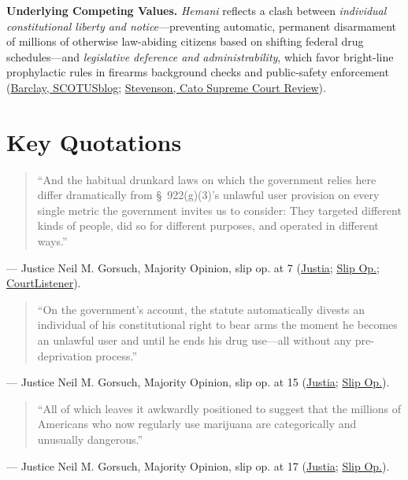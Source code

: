 \documentclass[12pt]{article}
\begin{document}
\textbf{Underlying Competing Values.} \textit{Hemani} reflects a clash between \textit{individual constitutional liberty and notice}---preventing automatic, permanent disarmament of millions of otherwise law-abiding citizens based on shifting federal drug schedules---and \textit{legislative deference and administrability}, which favor bright-line prophylactic rules in firearms background checks and public-safety enforcement (\href{https://www.scotusblog.com/2026/06/hemani-proving-the-reason-not-just-naming-it/}{Barclay, SCOTUSblog}; \href{https://www.cato.org/sites/cato.org/files/2026-09/2025-2026-Supreme-Court-Review-7.pdf}{Stevenson, Cato Supreme Court Review}).

\section{Key Quotations}

\begin{quote}
``And the habitual drunkard laws on which the government relies here differ dramatically from \S~922(g)(3)'s unlawful user provision on every single metric the government invites us to consider: They targeted different kinds of people, did so for different purposes, and operated in different ways.''
\end{quote}
\noindent --- Justice Neil M. Gorsuch, Majority Opinion, slip op. at 7 (\href{https://supreme.justia.com/cases/federal/us/608/24-1234/}{Justia}; \href{https://www.supremecourt.gov/opinions/25pdf/24-1234_g2bh.pdf}{Slip Op.}; \href{https://www.courtlistener.com/opinion/10876933/united-states-v-hemani/}{CourtListener}).

\begin{quote}
``On the government's account, the statute automatically divests an individual of his constitutional right to bear arms the moment he becomes an unlawful user and until he ends his drug use---all without any pre-deprivation process.''
\end{quote}
\noindent --- Justice Neil M. Gorsuch, Majority Opinion, slip op. at 15 (\href{https://supreme.justia.com/cases/federal/us/608/24-1234/}{Justia}; \href{https://www.supremecourt.gov/opinions/25pdf/24-1234_g2bh.pdf}{Slip Op.}).

\begin{quote}
``All of which leaves it awkwardly positioned to suggest that the millions of Americans who now regularly use marijuana are categorically and unusually dangerous.''
\end{quote}
\noindent --- Justice Neil M. Gorsuch, Majority Opinion, slip op. at 17 (\href{https://supreme.justia.com/cases/federal/us/608/24-1234/}{Justia}; \href{https://www.supremecourt.gov/opinions/25pdf/24-1234_g2bh.pdf}{Slip Op.}).
\end{document}

